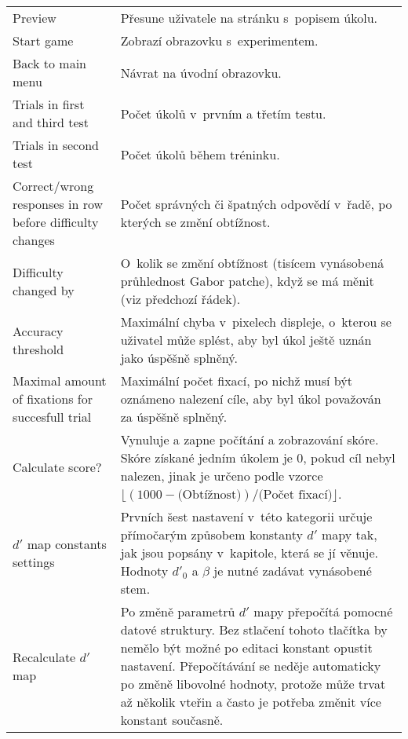 {\begin{longtable}{p{}p{}}
Preview & Přesune uživatele na stránku s~popisem úkolu. \\ 

Start game & Zobrazí obrazovku s~experimentem. \\

Back to main menu & Návrat na úvodní obrazovku. \\

Trials in first and third test & Počet úkolů  v~prvním a třetím testu. \\

Trials in second test & Počet úkolů během tréninku. \\

Correct/wrong responses in row before difficulty changes & Počet správných či
špatných odpovědí v~řadě, po kterých se změní obtížnost. \\

Difficulty changed by & O~kolik se změní obtížnost (tisícem vynásobená
průhlednost Gabor patche), když se má měnit (viz předchozí řádek). \\

Accuracy threshold & Maximální chyba v~pixelech displeje, o~kterou se uživatel
může splést, aby byl úkol ještě uznán jako úspěšně splněný. \\

Maximal amount of fixations for succesfull trial & Maximální počet fixací, po
nichž musí být oznámeno nalezení cíle, aby byl úkol považován za úspěšně
splněný. \\

Calculate score? & Vynuluje a zapne počítání a zobrazování skóre. Skóre získané
jedním úkolem je 0, pokud cíl nebyl nalezen, jinak je určeno podle vzorce
$\lfloor(1000 - \text{(Obtížnost)})/\text{(Počet fixací)}\rfloor$. \\

$d'$ map constants settings & Prvních šest nastavení v~této kategorii určuje
přímočarým způsobem konstanty $d'$ mapy tak, jak jsou popsány v~kapitole, která
se jí věnuje. Hodnoty $d'_0$ a $\beta$ je nutné zadávat vynásobené stem. \\

Recalculate $d'$ map & Po změně parametrů $d'$ mapy přepočítá pomocné datové
struktury. Bez stlačení tohoto tlačítka by nemělo být možné po editaci konstant
opustit nastavení. Přepočítávání se neděje automaticky po změně libovolné
hodnoty, protože může trvat až několik vteřin a často je potřeba změnit více
konstant současně. \\


\end{longtable}}
